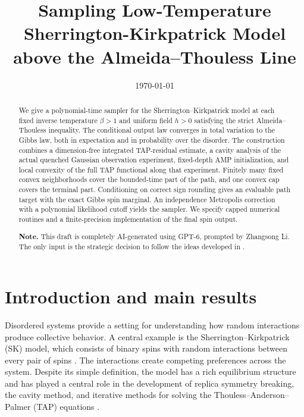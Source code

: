 \documentclass[11pt,reqno]{amsart}
\title[Sampling Low-Temperature SK model above the Almeida--Thouless Line]{Sampling Low-Temperature Sherrington-Kirkpatrick Model above the Almeida--Thouless Line}
\author{}
\date{\today}
\begin{document}
\begin{abstract}
We give a polynomial-time sampler for the Sherrington--Kirkpatrick model at each fixed inverse temperature $\beta>1$ and uniform field $h>0$ satisfying the strict Almeida--Thouless inequality. The conditional output law converges in total variation to the Gibbs law, both in expectation and in probability over the disorder. The construction combines a dimension-free integrated TAP-residual estimate, a cavity analysis of the actual quenched Gaussian observation experiment, fixed-depth AMP initialization, and local convexity of the full TAP functional along that experiment. Finitely many fixed convex neighborhoods cover the bounded-time part of the path, and one convex cap covers the terminal part. Conditioning on correct sign rounding gives an evaluable path target with the exact Gibbs spin marginal. An independence Metropolis correction with a polynomial likelihood cutoff yields the sampler. We specify capped numerical routines and a finite-precision implementation of the final spin output.

\textbf{Note.} This draft is completely AI-generated using GPT-6, prompted by Zhangsong Li. The only input is the strategic decision to follow the ideas developed in \cite{li2026efficient}. 
\end{abstract}
\maketitle
\enlargethispage{3pt}
\setcounter{tocdepth}{1}
\tableofcontents


\section{Introduction and main results}\label{sec:intro}

Disordered systems provide a setting for understanding how random interactions produce collective behavior. A central example is the Sherrington--Kirkpatrick (SK) model, which consists of binary spins with random interactions between every pair of spins \cite{sherrington1975solvable}. The interactions create competing preferences across the system. Despite its simple definition, the model has a rich equilibrium structure and has played a central role in the development of replica symmetry breaking, the cavity method, and iterative methods for solving the Thouless--Anderson--Palmer (TAP) equations \cite{talagrand2010mean,panchenko2013sherrington,thouless1977solution,bolthausen2014iterative}.
\end{document}
